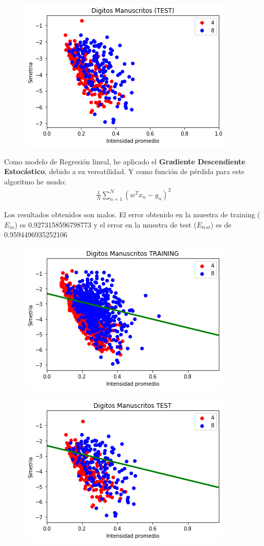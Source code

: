 \documentclass[a4paper,11pt]{article}
\begin{document}
\begin{figure}[h]
\includegraphics[scale=0.7]{ej3a2}
\centering
\end{figure}

Como modelo de Regresión lineal, he aplicado el \textbf{Gradiente Descendiente Estocástico}, debido a su versatilidad. Y como función de pérdida para este algoritmo he usado:
\begin{align*}
\frac{1}{N} \displaystyle\sum_{n=1}^{N}( w^T x_n - y_n )^2 
\end{align*}

Los resultados obtenidos son malos. El error obtenido en la muestra de training ($E_{in}$) es 0.9273158596798773 y el error en la muestra de test ($E_{test}$) es de 0.9594496935252106

\newpage

\begin{figure}[h]
\includegraphics[scale=0.7]{ej3bSGD1}
\centering
\end{figure}

\begin{figure}[h]
\includegraphics[scale=0.7]{ej3bSGD2}
\centering
\end{figure}
\end{document}
